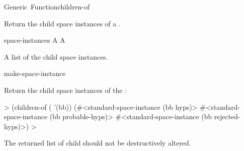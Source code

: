 \documentclass[10pt,twoside,english,pdftex]{article}
\begin{document}
\begin{functiondoc}{Generic~Function}{children-of}%
  {
    \returns{} }
%

\fnsyntax

\fnpurpose Return the child space instances of a .

\fnmethods
{}%
  {\code{(} 
    \returns{} }

\fnpackage {}

\fnmodule {}

\fnargs
\begin{args}{space-instances}
 A 
 A 
\end{args}

\fnreturns A list of the child space instances.

\begin{alsos}{make-space-instance}
\also[parent-of]
\end{alsos}

\fnexample
{}%
Return the child space instances  of the  :
%
\W\supp
\begin{example}
  > (children-of ( '(bb))
  (#<standard-space-instance (bb hyps)>
   #<standard-space-instance (bb probable-hyps)>
   #<standard-space-instance (bb rejected-hyps)>)
  >
\end{example}

\fnnote The returned list of child  should not be
destructively altered.

\end{functiondoc}

\end{document}
